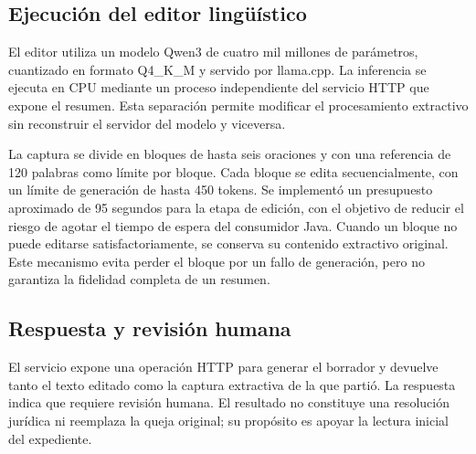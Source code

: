 \subsection{Ejecución del editor lingüístico}
El editor utiliza un modelo Qwen3 de cuatro mil millones de parámetros,
cuantizado en formato Q4\_K\_M y servido por llama.cpp. La inferencia se ejecuta
en CPU mediante un proceso independiente del servicio HTTP que expone el
resumen. Esta separación permite modificar el procesamiento extractivo sin
reconstruir el servidor del modelo y viceversa.

La captura se divide en bloques de hasta seis oraciones y con una referencia
de 120 palabras como límite por bloque. Cada bloque se edita secuencialmente,
con un límite de generación de hasta 450 tokens. Se implementó un presupuesto
aproximado de 95 segundos para la etapa de edición, con el objetivo de reducir
el riesgo de agotar el tiempo de espera del consumidor Java. Cuando un bloque
no puede editarse satisfactoriamente, se conserva su contenido extractivo
original. Este mecanismo evita perder el bloque por un fallo de generación,
pero no garantiza la fidelidad completa de un resumen.

\subsection{Respuesta y revisión humana}
El servicio expone una operación HTTP para generar el borrador y devuelve tanto
el texto editado como la captura extractiva de la que partió. La respuesta
indica que requiere revisión humana. El resultado no constituye una resolución
jurídica ni reemplaza la queja original; su propósito es apoyar la lectura
inicial del expediente.

